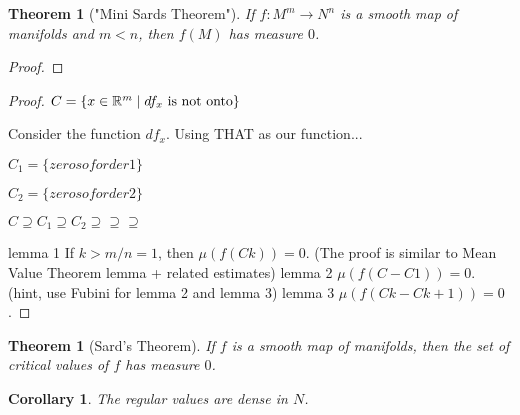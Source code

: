 \documentclass[11pt]{amsbook}
\theoremstyle{mystyle} \newtheorem{thrm}[thm]{Theorem}
\theoremstyle{mystyle} \newtheorem{defi}[thm]{Definition}
\theoremstyle{mystyle} \newtheorem{coro}[thm]{Corollary}
\theoremstyle{mystyle} \newtheorem{propo}[thm]{Proposition}
\theoremstyle{mystyle} \newtheorem{lemm}[thm]{Lemma}
\numberwithin{thm}{section}
\begin{document}
\begin{thrm}["Mini Sards Theorem"]
	If $f : M^m \to N^n$ is a smooth map of manifolds and $m < n$, then $f(M)$ has measure $0$.
\end{thrm}
\begin{proof}














\end{proof}
\begin{proof}
	$C = \{ x \in {\mathbb R}^m \mid df_x \text{ is not onto} \}$

	Consider the function $df_x$.  Using THAT as our function...

	$C_1 = \{zeros of order 1\}$

	$C_2 = \{zeros of order 2\}$

	$C \supseteq C_1 \supseteq C_2 \supseteq \supseteq \supseteq$

	lemma 1
		If $k > m/n = 1$, then $\mu(f(Ck)) = 0$.
		(The proof is similar to Mean Value Theorem lemma + related estimates)
	lemma 2
		$\mu(f(C-C1)) = 0$.
		(hint, use Fubini for lemma 2 and lemma 3)
	lemma 3
		$\mu(f(Ck-C{k+1})) = 0$.
\end{proof}
\begin{thrm}[Sard's Theorem]
	If $f$ is a smooth map of manifolds, then the set of critical values of $f$ has measure $0$.
\end{thrm}
\begin{coro}
	The regular values are dense in $N$.
\end{coro}
\end{document}
